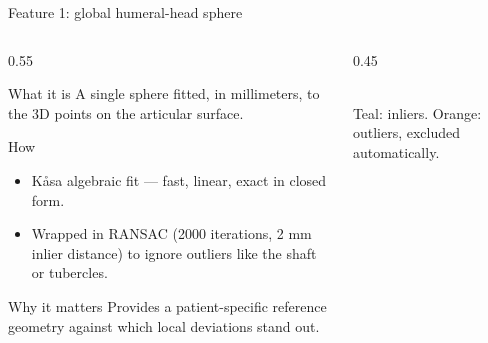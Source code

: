 \begin{frame}{Feature 1: global humeral-head sphere}
  \begin{columns}[T]
    \begin{column}{0.55\textwidth}
      \begin{block}{What it is}
        A single sphere fitted, in \alert{millimeters}, to the 3D points on the articular surface.
      \end{block}
      \begin{block}{How}
        \begin{itemize}
          \item \alert{K{\aa}sa} algebraic fit --- fast, linear, exact in closed form.
          \item Wrapped in \alert{RANSAC} (2000 iterations, 2 mm inlier distance) to ignore outliers like the shaft or tubercles.
        \end{itemize}
      \end{block}
      \begin{block}{Why it matters}
        Provides a patient-specific \alert{reference geometry} against which local deviations stand out.
      \end{block}
    \end{column}
    \begin{column}{0.45\textwidth}
      \centering
      \\[0.3em]
      {\scriptsize Teal: inliers. Orange: outliers, excluded automatically.}
    \end{column}
  \end{columns}
\end{frame}

